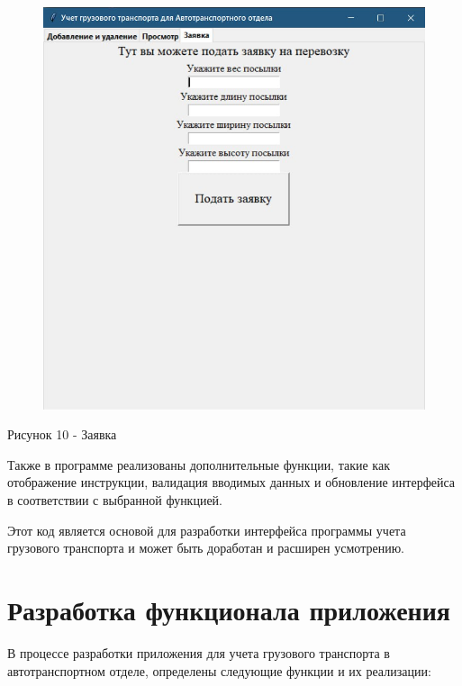 \documentclass[14pt]{extreport}
\begin{document}
\begin{figure}[H]
    \centering
    \includegraphics[scale=0.7]{4.jpg}
\end{figure}
\begin{center}
    Рисунок 10 - Заявка
\end{center}

Также в программе реализованы дополнительные функции, такие как отображение инструкции, валидация вводимых данных и обновление интерфейса в соответствии с выбранной функцией.

Этот код является основой для разработки интерфейса программы учета грузового транспорта и может быть доработан и расширен усмотрению.


\section{Разработка функционала приложения}
В процессе разработки приложения для учета грузового транспорта в автотранспортном отделе, определены следующие функции и их реализации:
\end{document}
